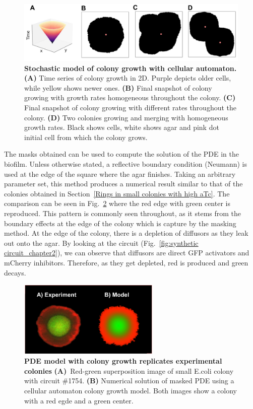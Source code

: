 \begin{figure}[H]
    \centering

    \includegraphics[width=1\textwidth]{chapters/Chapter 3/cas}
    \caption{\textbf{Stochastic model of colony growth with cellular automaton.} \textbf{(A)} Time series of colony growth in 2D. Purple depicts older cells, while yellow shows newer ones. \textbf{(B)} Final snapshot of colony growing with growth rates homogeneous throughout the colony. \textbf{(C)} Final snapshot of colony growing with different rates throughout the colony. \textbf{(D)} Two colonies growing and merging with homogeneous growth rates. Black shows cells, white shows agar and pink dot initial cell from which the colony grows.   }
    \label{cas}
\end{figure}
The masks obtained can be used to compute the solution of the PDE in the biofilm.
Unless otherwise stated, a reflective boundary condition (Neumann) is used at the edge of the square where the agar finishes.
Taking an arbitrary parameter set, this method produces a numerical result similar to that of the colonies obtained in Section~\ref{Rings in small colonies with high aTc}.
The comparison can be seen in Fig.~\ref{small colony experiment vs model} where the red edge with green center is reproduced.
This pattern is commonly seen throughout, as it stems from the boundary effects at the edge of the colony which is capture by the masking method.
At the edge of the colony, there is a depletion of diffusors as they leak out onto the agar.
By looking at the circuit (Fig.~\ref{fig:synthetic circuit_chapter2}), we can observe that diffusors are direct GFP activators and mCherry inhibitors.
Therefore, as they get depleted, red is produced and green decays.
\begin{figure}[H]
    \centering

    \includegraphics[width=0.6\textwidth]{chapters/Chapter 3/small colony experiment vs model}
    \caption{ \textbf{PDE model with colony growth replicates experimental colonies} \textbf{(A)}~Red-green superposition image of small E.coli colony with circuit \#1754.  \textbf{(B)} Numerical solution of masked PDE using a cellular automaton colony growth model. Both images show a colony with a red egde and a green center.}
    \label{small colony experiment vs model}
\end{figure}

